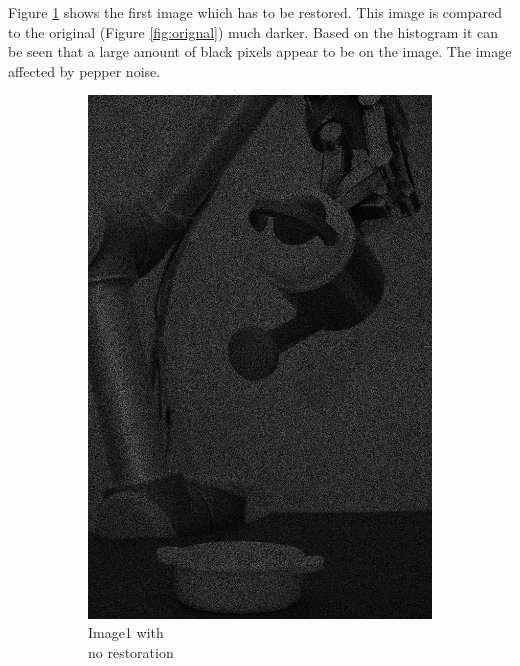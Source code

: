 Figure \ref{fig:img1_src} shows the first image which has to be restored. This image is compared to the original  (Figure \ref{fig:orignal}) much darker.  Based on the histogram  it can be seen that a large amount of black pixels appear to be on the image.  The image affected by pepper noise.  

\begin{figure}[H]
    \centering
    \begin{subfigure}[b]{0.23\textwidth}
        \includegraphics[width=\textwidth]{img1/Image1.png}
        \caption{Image1 with \\no restoration}
        \label{fig:img1_src}
    \end{subfigure}
    \begin{subfigure}[b]{0.446\textwidth}

\end{subfigure}
\end{figure}
